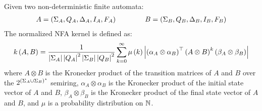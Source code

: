 \documentclass[12pt]{article}
\begin{document}
\begin{definition}
  Given two non-deterministic finite automata:
  \begin{align*}
    A = \left(\Sigma_A, Q_A, \Delta_A, I_A, F_A\right)
    \qquad \qquad
    B = \left(\Sigma_B, Q_B, \Delta_B, I_B, F_B\right)
  \end{align*}
  The normalized NFA kernel is defined as:
  \begin{align*}
  k\left(A, B\right)
    = \frac{1}{\left\lvert\Sigma_A\right\rvert \left\lvert Q_A\right\rvert^2 \left\lvert\Sigma_B\right\rvert \left\lvert Q_B\right\rvert^2}
        \sum_{k = 0}^{\infty}
          \mu\left(k\right)
          \left\lvert\left(\alpha_A \otimes \alpha_B\right)^\top
            \left(A \otimes B\right)^k
            \left(\beta_A \otimes \beta_B\right)\right\rvert
  \end{align*}
  where
  \(A \otimes B\) is the Kronecker product of the transition matrices
  of \(A\) and \(B\) over the
  \(2^{\left(\Sigma_A \cup \Sigma_B\right)^\star}\) semiring,
  \(\alpha_A \otimes \alpha_B\) is the Kronecker product of the initial
  state vector of \(A\) and \(B\),
  \(\beta_A \otimes \beta_B\) is the Kronecker product of the final
  state vector of \(A\) and \(B\),
  and \(\mu\) is a probability distribution on \(\mathbb{N}\).
\end{definition}
\end{document}
